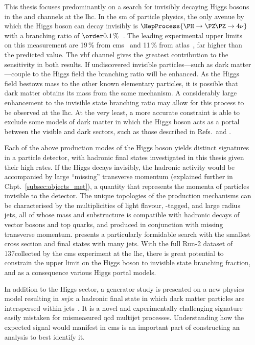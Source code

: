 This thesis focuses predominantly on a search for invisibly decaying Higgs bosons in the \ttH and \VH channels at the \acrshort{lhc}. In the \acrlong{sm} of particle physics, the only avenue by which the Higgs boson can decay invisibly is $\HepProcess{\PH \to \PZ\mkern-1mu\PZ \to \text{4}\nu}$ with a branching ratio of $\order{\text{0.1\,\%}}$~\cite{Heinemeyer:1559921}. The leading experimental upper limits on this measurement are 19\,\% from \acrshort{cms}~\cite{Sirunyan:2018owy} and 11\,\% from \acrshort{atlas}~\cite{ATLAS:2020kdi}, far higher than the predicted value. The \acrshort{vbf} channel gives the greatest contribution to the sensitivity in both results. If undiscovered invisible particles---such as dark matter---couple to the Higgs field the branching ratio will be enhanced. As the Higgs field bestows mass to the other known elementary particles, it is possible that dark matter obtains its mass from the same mechanism. A considerably large enhancement to the invisible state branching ratio may allow for this process to be observed at the \acrshort{lhc}. At the very least, a more accurate constraint is able to exclude some models of dark matter in which the Higgs boson acts as a portal between the visible and dark sectors, such as those described in Refs.~and .

Each of the above production modes of the Higgs boson yields distinct signatures in a particle detector, with hadronic final states investigated in this thesis given their high rates. If the Higgs decays invisibly, the hadronic activity would be accompanied by large ``missing'' transverse momentum (explained further in Chpt.~\ref{subsec:objects_met}), a quantity that represents the momenta of particles invisible to the detector. The unique topologies of the production mechanisms can be characterised by the multiplicities of light flavour, \Pqb-tagged, and large radius \glspl{jet}, all of whose mass and substructure is compatible with hadronic decays of vector bosons and top quarks, and produced in conjunction with missing transverse momentum. \ttH presents a particularly formidable search with the smallest cross section and final states with many \glspl{jet}. With the full Run-2 dataset of 137\fbinv collected by the \acrshort{cms} experiment at the \acrshort{lhc}, there is great potential to constrain the upper limit on the Higgs boson to invisible state branching fraction, and as a consequence various Higgs portal models.

In addition to the Higgs sector, a generator study is presented on a new physics model resulting in \emph{\glspl{svj}}: a hadronic final state in which dark matter particles are interspersed within \glspl{jet}~\cite{Cohen:2015toa,Cohen:2017pzm}. It is a novel and experimentally challenging signature easily mistaken for mismeasured \acrshort{qcd} multijet processes. Understanding how the expected signal would manifest in \acrshort{cms} is an important part of constructing an analysis to best identify it.

